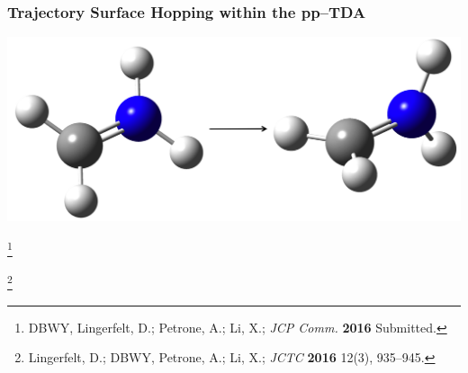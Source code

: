 \documentclass[usepdftitle=false,10pt]{beamer}
\newcommand\blfootnote[1]{%
  \begingroup
  \renewcommand\thefootnote{}\footnote{#1}%
  \addtocounter{footnote}{-1}%
  \endgroup
}
\begin{document}
\begin{frame}
  \frametitle{Trajectory Surface Hopping within the pp--TDA}
  \begin{center}
    \includegraphics[width=\textwidth]{GSCI}
  \end{center}
  \blfootnote{\tiny DBWY, Lingerfelt, D.; Petrone, A.; Li, X.; \emph{JCP Comm.} \textbf{2016} Submitted.}
  \blfootnote{\tiny Lingerfelt, D.; DBWY, Petrone, A.; Li, X.; \emph{JCTC} \textbf{2016} 12(3), 935--945.}
\end{frame}
\end{document}
